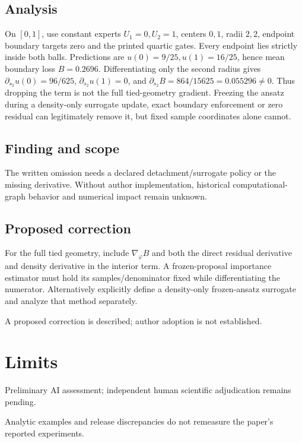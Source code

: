 \documentclass[11pt]{article}
\begin{document}
\subsection*{Analysis}

On \([0,1]\), use constant experts \(U_1=0,U_2=1\), centers \(0,1\), radii \(2,2\), endpoint boundary targets zero and the printed quartic gates. Every endpoint lies strictly inside both balls. Predictions are \(u(0)=9/25,u(1)=16/25\), hence mean boundary loss \(B=0.2696\). Differentiating only the second radius gives \(\partial_{s_2}u(0)=96/625\), \(\partial_{s_2}u(1)=0\), and \(\partial_{s_2}B=864/15625=0.055296\ne0\). Thus dropping the term is not the full tied-geometry gradient. Freezing the ansatz during a density-only surrogate update, exact boundary enforcement or zero residual can legitimately remove it, but fixed sample coordinates alone cannot.

\subsection*{Finding and scope}

The written omission needs a declared detachment/surrogate policy or the missing derivative. Without author implementation, historical computational-graph behavior and numerical impact remain unknown.

\subsection*{Proposed correction}

For the full tied geometry, include \(\nabla_\varphi B\) and both the direct residual derivative and density derivative in the interior term. A frozen-proposal importance estimator must hold its samples/denominator fixed while differentiating the numerator. Alternatively explicitly define a density-only frozen-ansatz surrogate and analyze that method separately.

A proposed correction is described; author adoption is not established.

\section*{Limits}

Preliminary AI assessment; independent human scientific adjudication remains pending.\par

Analytic examples and release discrepancies do not remeasure the paper’s reported experiments.\par
\end{document}
